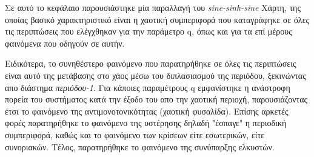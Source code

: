 Σε αυτό το κεφάλαιο παρουσιάστηκε μία παραλλαγή του \emph{sine-sinh-sine} Χάρτη, της οποίας βασικό χαρακτηριστικό είναι η χαοτική συμπεριφορά που καταγράφηκε σε όλες τις περιπτώσεις που ελέγχθηκαν για την παράμετρο q, όπως και για τα επί μέρους φαινόμενα που οδηγούν σε αυτήν.

Ειδικότερα, το συνηθέστερο φαινόμενο που παρατηρήθηκε σε όλες τις περιπτώσεις είναι αυτό της μετάβασης στο χάος μέσω του διπλασιασμού της περιόδου, ξεκινώντας απο διάστημα \emph{περιόδου-1}.
Για κάποιες παραμέτρους  q εμφανίστηκε η ανάστροφη πορεία του συστήματος κατά την έξοδο του απο την χαοτική περιοχή, παρουσιάζοντας έτσι το φαινόμενο της αντιμονοτονικότητας (χαοτική φυσαλίδα).
Επίσης αρκετές φορές παρατηρήθηκε το φαινόμενο της υστέρησης δηλαδή "έσπαγε" η περιοδική συμπεριφορά, καθώς και το φαινόμενο των κρίσεων είτε εσωτερικών, είτε συνοριακών. Τέλος, παρατηρήθηκε το φαινόμενο της συνύπαρξης ελκυστών. 
\newpage